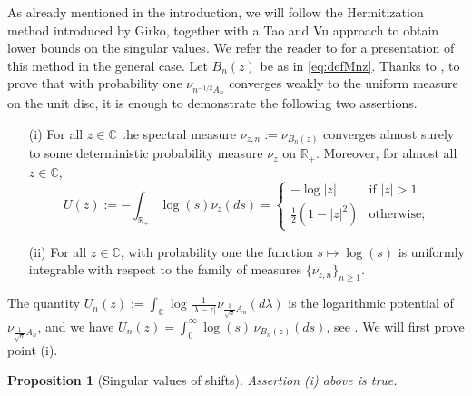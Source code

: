 \documentclass[12pt,reqno]{amsart}
\newtheorem{proposition}[lemma]{Proposition}
\begin{document}
As already mentioned in the introduction, we will follow the Hermitization
method introduced by Girko, together with a Tao and Vu approach to obtain
lower bounds on the singular values. We refer the reader to \cite{BCAround}
for a presentation of this method in the general case. Let $B_n(z)$ be as in
\eqref{eq:defMnz}. Thanks to \cite[Lemma 4.3]{BCAround}, to prove that with
probability one $\nu_{n^{-1/2}A_n}$ converges weakly to the uniform measure on
the unit disc, it is enough to demonstrate the following two assertions.
\begin{itemize}
\item[(i)] For all $z \in {\mathbb{C}}$ the spectral measure $\nu_{z,n} := \nu_{B_n(z)}$
  converges almost surely to some deterministic probability measure $\nu_z$ on
  ${\mathbb{R}}_+$. Moreover, for almost all $z\in {\mathbb{C}}$,
  \[
    U(z) := -\int_{{\mathbb{R}}_+} \log (s) \nu_z(ds) =
    \left\{
      \begin{array}{cc}
        -\log |z| & \textrm{if $|z| >1$}\\
        \frac{1}{2}(1-|z|^2) & \textrm{otherwise};
      \end{array}
    \right.
  \]
\item[(ii)] For all $z \in {\mathbb{C}}$, with probability one the function $s \mapsto
  \log(s)$ is uniformly integrable with respect to the family of measures
  $\{\nu_{z,n}\}_{n\ge 1}$.
\end{itemize}

The quantity $U_n(z) := \int_{\mathbb{C}}\!\log\frac{1}{| \lambda -
  z|}\nu_{\frac{1}{\sqrt{n}}A_n}(d\lambda)$ is the logarithmic potential of
$\nu_{\frac{1}{\sqrt{n}}A_n}$, and we have
$U_n(z)=\int_0^\infty\!\log(s)\,\nu_{B_n(z)}(ds)$, see \cite{BCAround}.
We will first prove point (i).

\begin{proposition}[Singular values of shifts] Assertion (i) above is true.
\end{proposition}
\end{document}
